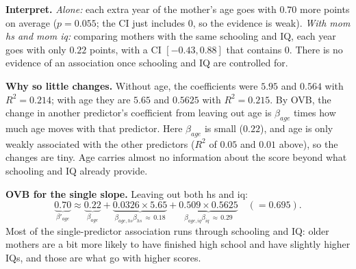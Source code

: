 \documentclass[11pt]{article}
\begin{document}
\begin{examplebox}[title={Question (10/21): interpret mom age; why does adding it change so little?}]
\textbf{Interpret.} \emph{Alone:} each extra year of the mother's age goes with $0.70$ more points on average ($p=0.055$; the CI just includes 0,
so the evidence is weak). \emph{With mom hs and mom iq:} comparing mothers with the same schooling and IQ, each year goes with only $0.22$
points, with a CI $[-0.43,0.88]$ that contains 0. There is no evidence of an association once schooling and IQ are controlled for.

\textbf{Why so little changes.} Without age, the coefficients were $5.95$ and $0.564$ with $R^2=0.214$; with age they are $5.65$ and $0.5625$
with $R^2=0.215$. By OVB, the change in another predictor's coefficient from leaving out age is $\beta_{age}$ times how much age moves with that
predictor. Here $\beta_{age}$ is small ($0.22$), and age is only weakly associated with the other predictors ($R^2$ of $0.05$ and $0.01$ above), so
the changes are tiny. Age carries almost no information about the score beyond what schooling and IQ already provide.

\textbf{OVB for the single slope.} Leaving out both hs and iq:
\[
\underbrace{0.70}_{\beta'_{age}}\approx\underbrace{0.22}_{\beta_{age}}+\underbrace{0.0326\times5.65}_{\beta_{age,hs}\beta_{hs}\,\approx\,0.18}
+\underbrace{0.509\times0.5625}_{\beta_{age,iq}\beta_{iq}\,\approx\,0.29}\quad(=0.695).
\]
Most of the single-predictor association runs through schooling and IQ: older mothers are a bit more likely to have finished high school and
have slightly higher IQs, and those are what go with higher scores.
\end{examplebox}
\begin{center}
\end{center}
\end{document}
